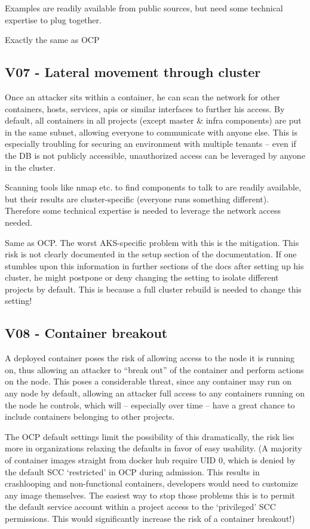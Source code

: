 Examples are readily available from public sources, but need some technical expertise to plug together.

Exactly the same as OCP

\subsection{V07 - Lateral movement through cluster}
Once an attacker sits within a container, he can scan the network for other containers, hosts, services, apis or similar interfaces to further his access. By default, all containers in all projects (except master \& infra components) are put in the same subnet, allowing everyone to communicate with anyone else.
This is especially troubling for securing an environment with multiple tenants – even if the DB is not publicly accessible, unauthorized access can be leveraged by anyone in the cluster.

Scanning tools like nmap etc. to find components to talk to are readily available, but their results are cluster-specific (everyone runs something different). Therefore some technical expertise is needed to leverage the network access needed. 

Same as OCP. 
The worst AKS-specific problem with this is the mitigation. This risk is not clearly documented in the setup section of the documentation. If one stumbles upon this information in further sections of the docs after setting up his cluster, he might postpone or deny changing the setting to isolate different projects by default. This is because a full cluster rebuild is needed to change this setting!

\subsection{V08 - Container breakout}

A deployed container poses the risk of allowing access to the node it is running on, thus allowing an attacker to “break out” of the container and perform actions on the node.
This poses a considerable threat, since any container may run on any node by default, allowing an attacker full access to any containers running on the node he controls, which will – especially over time – have a great chance to include containers belonging to other projects.

The OCP default settings limit the possibility of this dramatically, the risk lies more in organizations relaxing the defaults in favor of easy usability. (A majority of container images straight from docker hub require UID 0, which is denied by the default SCC ‘restricted’ in OCP during admission. This results in crashlooping and non-functional containers, developers would need to customize any image themselves. The easiest way to stop those problems this is to permit the default service account within a project access to the ‘privileged’ SCC permissions. This would significantly increase the risk of a container breakout!)

